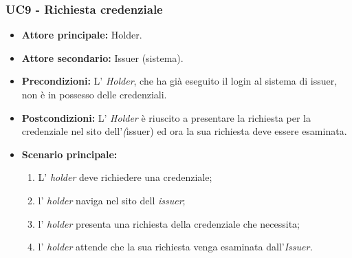 \subsubsection{UC9 - Richiesta credenziale}
\begin{itemize}
\item \textbf{Attore principale:} Holder.
\item \textbf{Attore secondario:} Issuer (sistema). 
\item \textbf{Precondizioni:} L’ \textit{Holder}, che ha già eseguito il login al sistema di issuer, non è in possesso delle credenziali.
\item \textbf{Postcondizioni:} L’ \textit{Holder} è riuscito a presentare la richiesta per la credenziale nel sito dell'\textit(issuer) ed ora la sua richiesta deve essere esaminata.
\item \textbf{Scenario principale:} 
    \begin{enumerate}
        \item L' \textit{holder} deve richiedere una credenziale; 
        \item l' \textit{holder} naviga nel sito dell \textit{issuer};
        \item l' \textit{holder} presenta una richiesta della credenziale che necessita;
        \item l' \textit{holder} attende che la sua richiesta venga esaminata dall'\textit{Issuer.}
    \end{enumerate}
\end{itemize}

